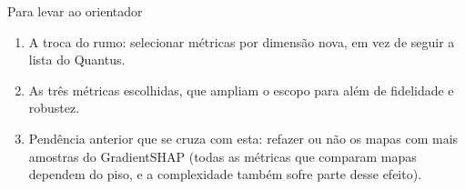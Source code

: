 \documentclass[11pt,a4paper]{article}
\begin{document}
\begin{infobox}[note]{Para levar ao orientador}
\begin{enumerate}
\item A troca do rumo: selecionar métricas por dimensão nova, em vez de seguir a lista do Quantus.
\item As três métricas escolhidas, que ampliam o escopo para além de fidelidade e robustez.
\item Pendência anterior que se cruza com esta: refazer ou não os mapas com mais amostras do GradientSHAP (todas as métricas que comparam mapas dependem do piso, e a complexidade também sofre parte desse efeito).
\end{enumerate}
\end{infobox}
\end{document}
